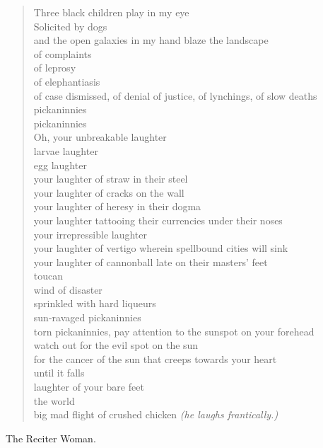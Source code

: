 \documentclass[letterpaper,article,12pt,oneside,notitlepage]{memoir}
\begin{document}
\begin{verse}
Three black children play in my eye \\
Solicited by dogs \\
and the open galaxies in my hand blaze the landscape \\
of complaints \\
of leprosy \\
of elephantiasis \\
of case dismissed, of denial of justice, of lynchings, of slow deaths \\
pickaninnies \\
pickaninnies \\
Oh, your unbreakable laughter \\
larvae laughter \\
egg laughter \\
your laughter of straw in their steel \\
your laughter of cracks on the wall \\
your laughter of heresy in their dogma \\
your laughter tattooing their currencies under their noses \\
your irrepressible laughter \\
your laughter of vertigo wherein spellbound cities will sink \\
your laughter of cannonball late on their masters' feet \\
toucan \\
wind of disaster \\
sprinkled with hard liqueurs \\
sun-ravaged pickaninnies \\
torn pickaninnies, pay attention to the sunspot on your forehead \\
watch out for the evil spot on the sun \\
for the cancer of the sun that creeps towards your heart \\
until it falls \\
laughter of your bare feet \\
the world \\
big mad flight of crushed chicken \textit{(he laughs frantically.)} \\
\end{verse}

\clearpage

\begin{center}The Reciter Woman.\end{center}
\end{document}
